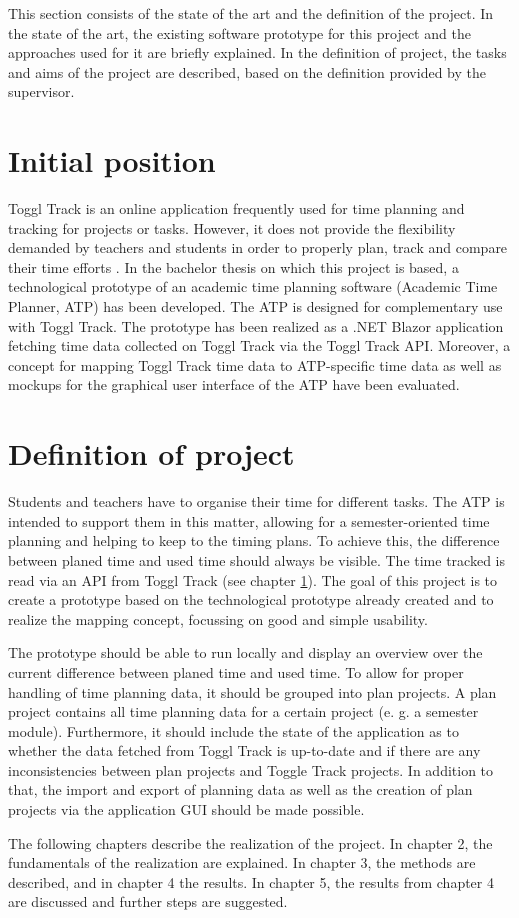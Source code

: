 
This section consists of the state of the art and the definition of the project. In the state of the art, the existing software prototype for this project and the approaches used for it are briefly explained. In the definition of project, the tasks and aims of the project are described, based on the definition provided by the supervisor.

\section{Initial position} \label{Initial position}
Toggl Track \cite{toggl_track_url} is an online application frequently used for time planning and tracking for projects or tasks. However, it does not provide the flexibility demanded by teachers and students in order to properly plan, track and compare their time efforts \cite{bachelorarbeit_Egger_Verstappen_page2}. In the bachelor thesis \cite{bachelorarbeit_Egger_Verstappen_page1} on which this project is based, a technological prototype of an academic time planning software (Academic Time Planner, ATP) has been developed. The ATP is designed for complementary use with Toggl Track. The prototype has been realized as a .NET Blazor application fetching time data collected on Toggl Track via the Toggl Track API. Moreover, a concept for mapping Toggl Track time data to ATP-specific time data as well as mockups for the graphical user interface of the ATP have been evaluated.

\section{Definition of project} \label{Definition}
Students and teachers have to organise their time for different tasks. The ATP is intended to support them in this matter, allowing for a semester-oriented time planning and helping to keep to the timing plans. To achieve this, the difference between planed time and used time should always be visible. The time tracked is read via an API from Toggl Track (see chapter \ref{Initial position}). The goal of this project is to create a prototype based on the technological prototype already created and to realize the mapping concept, focussing on good and simple usability.

The prototype should be able to run locally and display an overview over the current difference between planed time and used time. To allow for proper handling of time planning data, it should be grouped into plan projects. A plan project contains all time planning data for a certain project (e. g. a semester module). Furthermore, it should include the state of the application as to whether the data fetched from Toggl Track is up-to-date and if there are any inconsistencies between plan projects and Toggle Track projects. In addition to that, the import and export of planning data as well as the creation of plan projects via the application GUI should be made possible.

The following chapters describe the realization of the project. In chapter 2, the fundamentals of the realization are explained. In chapter 3, the methods are described, and in chapter 4 the results. In chapter 5, the results from chapter 4 are discussed and further steps are suggested.
 


